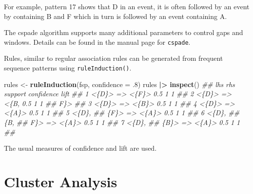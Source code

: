 \documentclass[
  notitlepage]{book}
\newenvironment{Shaded}{\begin{snugshade}}{\end{snugshade}}
\newcommand{\CommentTok}[1]{\textcolor[rgb]{0.56,0.35,0.01}{\textit{#1}}}
\newcommand{\DataTypeTok}[1]{\textcolor[rgb]{0.13,0.29,0.53}{#1}}
\newcommand{\ErrorTok}[1]{\textcolor[rgb]{0.64,0.00,0.00}{\textbf{#1}}}
\newcommand{\FloatTok}[1]{\textcolor[rgb]{0.00,0.00,0.81}{#1}}
\newcommand{\KeywordTok}[1]{\textcolor[rgb]{0.13,0.29,0.53}{\textbf{#1}}}
\newcommand{\NormalTok}[1]{#1}
\newcommand{\OperatorTok}[1]{\textcolor[rgb]{0.81,0.36,0.00}{\textbf{#1}}}
\newcommand{\StringTok}[1]{\textcolor[rgb]{0.31,0.60,0.02}{#1}}
\begin{document}
For example, pattern 17 shows that D in an event, it is often followed by
an event by containing B and F which in turn is followed by an event
containing A.

The cspade algorithm supports many additional parameters to control gaps
and windows. Details can be found in the manual page for \texttt{cspade}.

Rules, similar to regular association rules can be generated
from frequent sequence patterns using \texttt{ruleInduction()}.

\begin{Shaded}
\begin{Highlighting}[]
\NormalTok{rules \textless{}{-}}\StringTok{ }\KeywordTok{ruleInduction}\NormalTok{(fsp, }\DataTypeTok{confidence =} \FloatTok{.8}\NormalTok{)}
\NormalTok{rules }\OperatorTok{|}\ErrorTok{\textgreater{}}\StringTok{ }\KeywordTok{inspect}\NormalTok{()}
\CommentTok{\#\#    lhs      rhs   support confidence lift }
\CommentTok{\#\#  1 \textless{}\{D\}\textgreater{} =\textgreater{} \textless{}\{F\}\textgreater{}     0.5          1    1 }
\CommentTok{\#\#  2 \textless{}\{D\}\textgreater{} =\textgreater{} \textless{}\{B,      0.5          1    1 }
\CommentTok{\#\#               F\}\textgreater{}    }
\CommentTok{\#\#  3 \textless{}\{D\}\textgreater{} =\textgreater{} \textless{}\{B\}\textgreater{}     0.5          1    1 }
\CommentTok{\#\#  4 \textless{}\{D\}\textgreater{} =\textgreater{} \textless{}\{A\}\textgreater{}     0.5          1    1 }
\CommentTok{\#\#  5 \textless{}\{D\},             }
\CommentTok{\#\#     \{F\}\textgreater{} =\textgreater{} \textless{}\{A\}\textgreater{}     0.5          1    1 }
\CommentTok{\#\#  6 \textless{}\{D\},             }
\CommentTok{\#\#     \{B,              }
\CommentTok{\#\#      F\}\textgreater{} =\textgreater{} \textless{}\{A\}\textgreater{}     0.5          1    1 }
\CommentTok{\#\#  7 \textless{}\{D\},             }
\CommentTok{\#\#     \{B\}\textgreater{} =\textgreater{} \textless{}\{A\}\textgreater{}     0.5          1    1 }
\CommentTok{\#\# }
\end{Highlighting}
\end{Shaded}

The usual measures of confidence and lift are used.

\hypertarget{cluster-analysis}{%
\chapter{Cluster Analysis}\label{cluster-analysis}}
\end{document}
